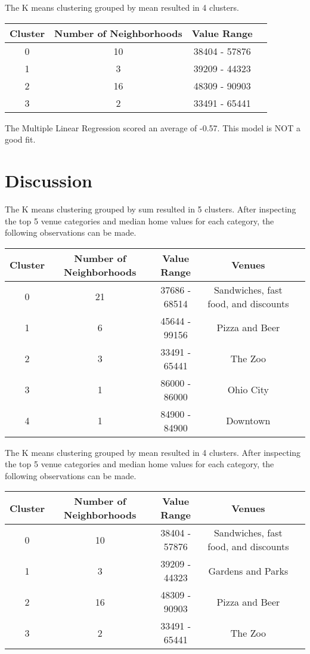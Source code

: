 \documentclass[twoside,14pt]{report}
\begin{document}
The K means clustering grouped by mean resulted in 4 clusters.

\begin{tabular}{c|c|c|c}
Cluster & Number of Neighborhoods & Value Range\\ \hline
0 & 10 & 38404 - 57876\\
1 & 3 & 39209 - 44323 \\
2 & 16 & 48309 - 90903 \\
3 & 2 & 33491 - 65441 \\
\end{tabular}

The Multiple Linear Regression scored an average of -0.57.  This model is NOT a good fit. 

\chapter*{Discussion}

The K means clustering grouped by sum resulted in 5 clusters.  After inspecting the top 5 venue categories and median home values for each category, the following observations can be made.

\begin{tabular}{c|c|c|c|l}
Cluster & Number of Neighborhoods & Value Range&Venues\\ \hline
0 & 21 & 37686 - 68514& Sandwiches, fast food, and discounts\\
1 & 6 & 45644 - 99156 & Pizza and Beer \\
2 & 3 & 33491 - 65441 & The Zoo\\
3 & 1 & 86000 - 86000 & Ohio City \\
4&1&84900 - 84900 & Downtown\\
\end{tabular}

The K means clustering grouped by mean resulted in 4 clusters.  After inspecting the top 5 venue categories and median home values for each category, the following observations can be made.

\begin{tabular}{c|c|c|c|l}
Cluster & Number of Neighborhoods & Value Range&Venues\\ \hline
0 & 10 & 38404 - 57876&Sandwiches, fast food, and discounts\\
1 & 3 & 39209 - 44323 & Gardens and Parks \\
2 & 16 & 48309 - 90903 & Pizza and Beer \\
3 & 2 & 33491 - 65441 & The Zoo\\
\end{tabular}
\end{document}
